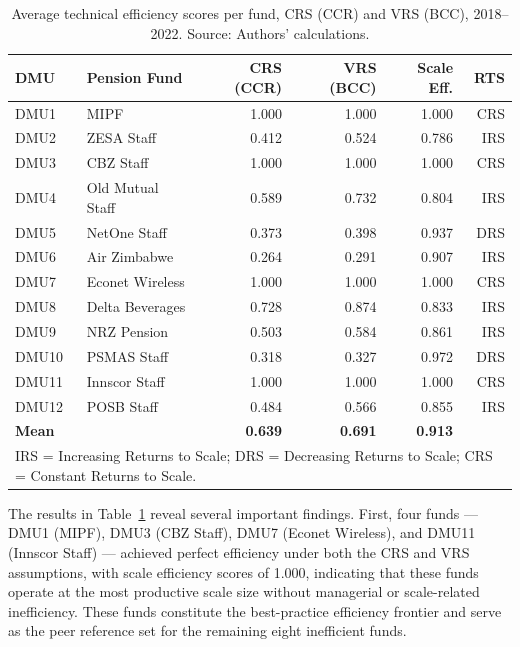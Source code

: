 \documentclass[12pt,a4paper]{article}
\begin{document}
\begin{table}[H]
\centering
\caption{Average technical efficiency scores per fund, CRS (CCR) and VRS (BCC), 2018--2022. Source: Authors' calculations.}
\label{tab:vrs_scores}
\begin{tabular}{llrrrr}
\toprule
\textbf{DMU} & \textbf{Pension Fund} & \textbf{CRS (CCR)} & \textbf{VRS (BCC)} & \textbf{Scale Eff.} & \textbf{RTS} \\
\midrule
DMU1  & MIPF              & 1.000 & 1.000 & 1.000 & CRS \\
DMU2  & ZESA Staff        & 0.412 & 0.524 & 0.786 & IRS \\
DMU3  & CBZ Staff         & 1.000 & 1.000 & 1.000 & CRS \\
DMU4  & Old Mutual Staff  & 0.589 & 0.732 & 0.804 & IRS \\
DMU5  & NetOne Staff      & 0.373 & 0.398 & 0.937 & DRS \\
DMU6  & Air Zimbabwe      & 0.264 & 0.291 & 0.907 & IRS \\
DMU7  & Econet Wireless   & 1.000 & 1.000 & 1.000 & CRS \\
DMU8  & Delta Beverages   & 0.728 & 0.874 & 0.833 & IRS \\
DMU9  & NRZ Pension       & 0.503 & 0.584 & 0.861 & IRS \\
DMU10 & PSMAS Staff       & 0.318 & 0.327 & 0.972 & DRS \\
DMU11 & Innscor Staff     & 1.000 & 1.000 & 1.000 & CRS \\
DMU12 & POSB Staff        & 0.484 & 0.566 & 0.855 & IRS \\
\midrule
\textbf{Mean} & & \textbf{0.639} & \textbf{0.691} & \textbf{0.913} & \\
\bottomrule
\multicolumn{6}{l}{\footnotesize IRS = Increasing Returns to Scale; DRS = Decreasing Returns to Scale; CRS = Constant Returns to Scale.}
\end{tabular}
\end{table}

The results in Table~\ref{tab:vrs_scores} reveal several important findings. First, four funds --- DMU1 (MIPF), DMU3 (CBZ Staff), DMU7 (Econet Wireless), and DMU11 (Innscor Staff) --- achieved perfect efficiency under both the CRS and VRS assumptions, with scale efficiency scores of 1.000, indicating that these funds operate at the most productive scale size without managerial or scale-related inefficiency. These funds constitute the best-practice efficiency frontier and serve as the peer reference set for the remaining eight inefficient funds.
\end{document}
